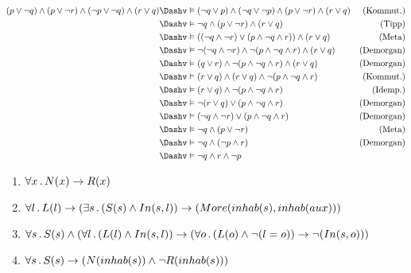 




\date{Donnerstag 21.11.2019}

\newcommand\X{\mathcal{X}}



\maketitle
\thispagestyle{fancy}


\begin{align*}
	(p\lor\lnot q)\land (p\lor\lnot r)\land (\lnot p\lor\lnot q) \land (r\lor q)  &\bimodels (\lnot q \lor p) \land (\lnot q\lor\lnot p) \land (p\lor\lnot r) \land (r\lor q) & \text{(Kommut.)} \\
	 &\bimodels \lnot q \land (p\lor\lnot r) \land (r\lor q) & \text{(Tipp)} \\
	 &\bimodels ((\lnot q \land \lnot r) \lor (p \land \lnot q \land r)) \land (r\lor q) & \text{(Meta)} \\
	 &\bimodels \lnot(\lnot q \land \lnot r) \land \lnot(p \land \lnot q \land r) \land (r\lor q) & \text{(Demorgan)} \\
	 &\bimodels (q \lor r) \land \lnot(p \land \lnot q \land r) \land (r \lor q) & \text{(Demorgan)} \\
	 &\bimodels (r \lor q) \land (r \lor q) \land \lnot(p \land \lnot q \land r) & \text{(Kommut.)} \\
	 &\bimodels (r \lor q) \land \lnot(p \land \lnot q \land r) & \text{(Idemp.)} \\
	 &\bimodels \lnot(r \lor q) \lor (p \land \lnot q \land r) & \text{(Demorgan)} \\
	 &\bimodels (\lnot q \land \lnot r) \lor (p \land \lnot q \land r) & \text{(Demorgan)} \\
	 &\bimodels \lnot q \land (p\lor\lnot r) & \text{(Meta)} \\
	 &\bimodels \lnot q \land (\lnot p \land r) & \text{(Demorgan)} \\
	&\bimodels \lnot q\land r \land \lnot p
\end{align*}


\begin{enumerate}
	\item $ \forall x \, . \, N(x) \to R(x) $
	\item $ \forall l \, . \, L(l) \to (\exists s \, . \, (S(s) \land In(s,l)) \to (More(inhab(s), inhab(aux))) $
	\item $ \forall s \, . \, S(s) \land (\forall l \, . \, (L(l) \land In(s,l)) \to (\forall o \, . \, (L(o) \land \lnot(l=o))  \to \lnot (In(s,o))) $
	\item $ \forall s \, . \, S(s) \to (N(inhab(s)) \land \lnot R(inhab(s)))$
\end{enumerate}


